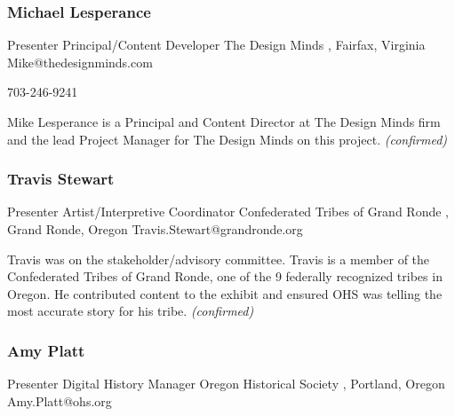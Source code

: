 \documentclass{report}
\begin{document}
              
                \subsubsection*{ Michael Lesperance  }
                Presenter\newline
                Principal/Content Developer \newline
                The Design Minds , Fairfax, Virginia 
                \newline
                Mike@thedesignminds.com\newline
                
                703-246-9241\newline

                Mike Lesperance is a Principal and Content Director at The Design Minds firm and the lead Project Manager for The Design Minds on this project.
                \emph{ (confirmed) }
              

              
                \subsubsection*{ Travis  Stewart  }
                Presenter\newline
                Artist/Interpretive Coordinator \newline
                Confederated Tribes of Grand Ronde , Grand Ronde, Oregon 
                \newline
                Travis.Stewart@grandronde.org\newline
                
                

                Travis was on the stakeholder/advisory committee. Travis is a member of the Confederated Tribes of Grand Ronde, one of the 9 federally recognized tribes in Oregon. He  contributed content to the exhibit and ensured OHS was telling the most accurate story for his tribe.
                \emph{ (confirmed) }
              

              
                \subsubsection*{ Amy  Platt }
                Presenter\newline
                Digital History Manager \newline
                Oregon Historical Society , Portland, Oregon 
                \newline
                Amy.Platt@ohs.org\newline
                
\end{document}
